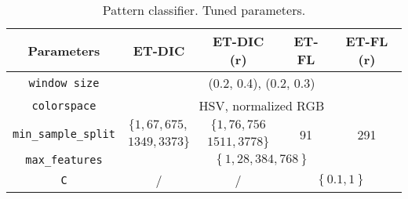 \begin{table}
	\center 
	\begin{tabular}{|c|cccc|}
		\hline
		Parameters & ET-DIC & ET-DIC (r) & ET-FL & ET-FL (r) \\
		\hline		
		\texttt{window size} & \multicolumn{4}{|c|}{(0.2, 0.4), (0.2, 0.3)} \\
		\texttt{colorspace} & \multicolumn{4}{|c|}{HSV, normalized RGB} \\
		\multirow{2}{*}{\texttt{min\_sample\_split}} & $\{1, 67, 675,$ &  $\{1, 76, 756$ & \multirow{2}{*}{91} & \multirow{2}{*}{291}\\
		& $1349, 3373\}$ & $1511, 3778\}$ & & \\
		\texttt{max\_features} & \multicolumn{4}{|c|}{$\left\{1, 28, 384, 768\right\}$}\\ 
		\texttt{C} & / & / & \multicolumn{2}{c|}{$\left\{0.1, 1\right\}$}\\
		\hline
	\end{tabular}
	\caption{Pattern classifier. Tuned parameters.}
	\label{tab:app_pattern_classif_tuned}
\end{table}


